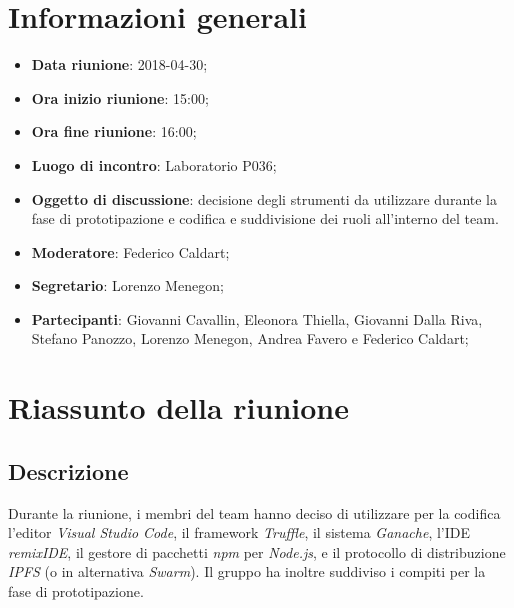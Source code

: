 \section{Informazioni generali}
	\begin{itemize}
		\item \textbf{Data riunione}: 2018-04-30;
		\item \textbf{Ora inizio riunione}: 15:00;
		\item \textbf{Ora fine riunione}: 16:00;
		\item \textbf{Luogo di incontro}: Laboratorio P036;
		\item \textbf{Oggetto di discussione}: decisione degli strumenti da utilizzare durante la fase di prototipazione e codifica e suddivisione dei ruoli all'interno del team.
		\item \textbf{Moderatore}: Federico Caldart;
		\item \textbf{Segretario}: Lorenzo Menegon;
		\item \textbf{Partecipanti}: Giovanni Cavallin, Eleonora Thiella, Giovanni Dalla Riva, Stefano Panozzo, Lorenzo Menegon, Andrea Favero e Federico Caldart;
	\end{itemize}

\section{Riassunto della riunione}
	\subsection{Descrizione} Durante la riunione, i membri del team hanno deciso di utilizzare per la codifica l'editor \emph{Visual Studio Code}, il framework \emph{Truffle}, il sistema \emph{Ganache}, l'IDE \emph{remixIDE}, il gestore di pacchetti \emph{npm} per \emph{Node.js}, e il protocollo di distribuzione \emph{IPFS} (o in alternativa \emph{Swarm}). Il gruppo ha inoltre suddiviso i compiti per la fase di prototipazione.
	
